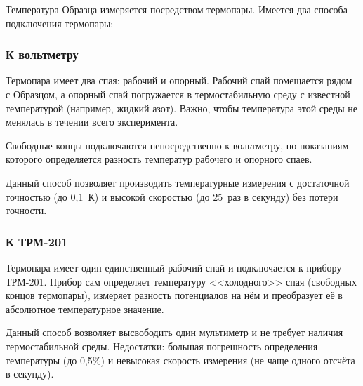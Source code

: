 \label{sec_t_measures}

Температура Образца измеряется посредством термопары. Имеется два способа подключения термопары:

\subsubsection*{К вольтметру}

Термопара имеет два спая: рабочий и опорный. Рабочий спай помещается рядом с Образцом, а опорный спай погружается в термостабильную среду с известной температурой (например, жидкий азот). Важно, чтобы температура этой среды не менялась в течении всего эксперимента.

Свободные концы подключаются непосредственно к вольтметру, по показаниям которого определяется разность температур рабочего и опорного спаев.

Данный способ позволяет производить температурные измерения с достаточной точностью (до 0,1~К) и высокой скоростью (до 25~раз в секунду) без потери точности.

\subsubsection*{К ТРМ-201}

Термопара имеет один единственный рабочий спай и подключается к прибору ТРМ-201. Прибор сам определяет температуру <<холодного>> спая (свободных концов термопары), измеряет разность потенциалов на нём и преобразует её в абсолютное температурное значение.

Данный способ возволяет высвободить один мультиметр и не требует наличия термостабильной среды. Недостатки: большая погрешность определения температуры (до 0,5\%) и невысокая скорость измерения (не чаще одного отсчёта в секунду).